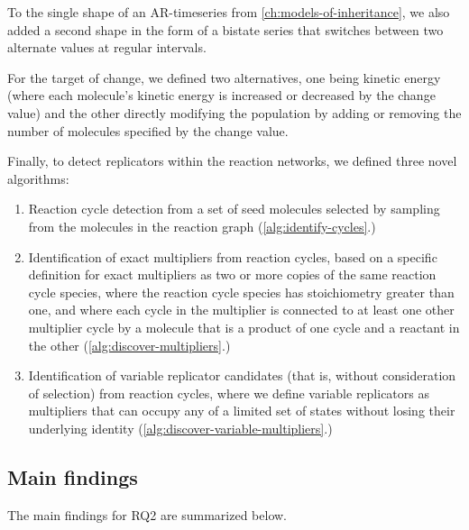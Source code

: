 To the single shape of an AR-timeseries from \cref{ch:models-of-inheritance}, we also added a second shape in the form of a bistate series that switches between two alternate values at regular intervals. 

For the target of change, we defined two alternatives, one being kinetic energy (where each molecule's kinetic energy is increased or decreased by the change value) and the other directly modifying the population by adding or removing the number of molecules specified by the change value.

Finally, to detect replicators within the reaction networks, we defined three novel algorithms:
\begin{enumerate}
\item Reaction cycle detection from a set of seed molecules selected by sampling from the molecules in the reaction graph (\cref{alg:identify-cycles}.)
\item Identification of exact multipliers from reaction cycles, based on a specific definition for exact multipliers as two or more copies of the same reaction cycle species, where the reaction cycle species has stoichiometry greater than one, and where each cycle in the multiplier is connected to at least one other multiplier cycle by a molecule that is a product of one cycle and a reactant in the other (\cref{alg:discover-multipliers}.)
\item Identification of variable replicator candidates (that is, without consideration of selection) from reaction cycles, where we define variable replicators as multipliers that can occupy any of a limited set of states without losing their underlying identity (\cref{alg:discover-variable-multipliers}.)
\end{enumerate}

\subsection{Main findings}

The main findings for RQ2 are summarized below.

